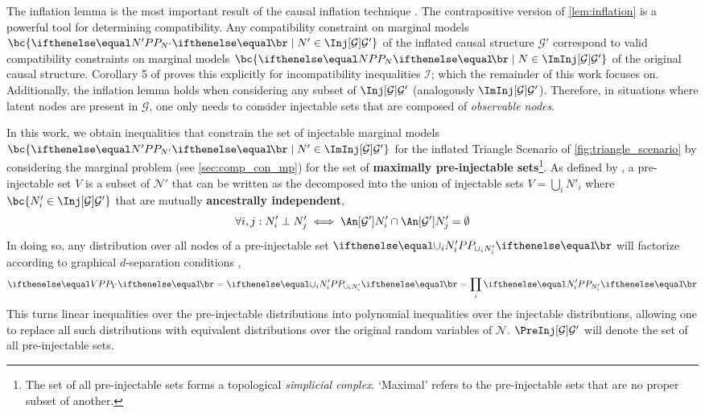 \documentclass[aps, 10pt, english, twoside, pra, nofootinbib, longbibliography]{revtex4-1}
\theoremstyle{plain}
\theoremstyle{definition}
\theoremstyle{remark}
\newcommand{\graph}{\mathcal{G}}
\newcommand{\nodes}{\mathcal{N}}
\newcommand{\ancestralindep}{\perp}
\newcommand{\term}[1]{\textcolor{Mahogany}{\textbf{#1}}}
\begin{document}
    The inflation lemma is the most important result of the causal inflation technique \cite{Inflation}. The contrapositive version of \cref{lem:inflation} is a powerful tool for determining compatibility. Any compatibility constraint on marginal models $\bc{\prob[N'] \mid N' \in \Inj[\graph]{\graph'}}$ of the inflated causal structure $\graph'$ correspond to valid compatibility constraints on marginal models $\bc{\prob[N] \mid N \in \ImInj[\graph]{\graph'}}$ of the original causal structure. Corollary 5 of \cite{Inflation} proves this explicitly for incompatibility inequalities $\mathcal{I}$; which the remainder of this work focuses on.  Additionally, the inflation lemma holds when considering any subset of $\Inj[\graph]{\graph'}$ (analogously $\ImInj[\graph]{\graph'}$). Therefore, in situations where latent nodes are present in $\graph$, one only needs to consider injectable sets that are composed of \textit{observable nodes}.

    In this work, we obtain inequalities that constrain the set of injectable marginal models $\bc{\prob[N'] \mid N' \in \ImInj[\graph]{\graph'}}$ for the inflated Triangle Scenario of \cref{fig:triangle_scenario} by considering the marginal problem (see \cref{sec:comp_con_mp}) for the set of \term{maximally pre-injectable sets}\footnote{The set of all pre-injectable sets forms a topological \textit{simplicial conplex}. `Maximal' refers to the pre-injectable sets that are no proper subset of another.}. As defined by \cite{Inflation}, a pre-injectable set $V$ is a subset of $\nodes'$ that can be written as the decomposed into the union of injectable sets $V = \bigcup_i N'_i$ where $\bc{N'_i \in \Inj[\graph]{\graph'}}$ that are mutually \term{ancestrally independent},
    \[ \forall i,j : N'_i \ancestralindep N'_j \iff \An[\graph']{N'_i} \cap \An[\graph']{N'_j} = \emptyset  \]
    In doing so, any distribution over all nodes of a pre-injectable set $\prob[\cup_i N'_i]$ will factorize according to graphical $d$-separation conditions \cite{Pearl_2009},
    \[ \prob[V] = \prob[\cup_i N'_i] = \prod_{i}\prob[N'_i] \]
    This turns linear inequalities over the pre-injectable distributions into polynomial inequalities over the injectable distributions, allowing one to replace all such distributions with equivalent distributions over the original random variables of $\nodes$. $\PreInj[\graph]{\graph'}$ will denote the set of all pre-injectable sets.
\end{document}
